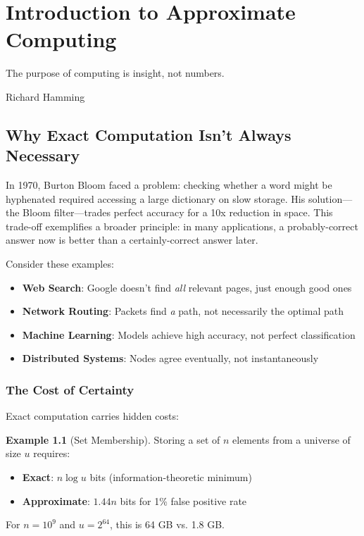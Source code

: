 \documentclass[11pt,twoside,openright]{book}
\theoremstyle{definition}
\newtheorem{example}[definition]{Example}
\theoremstyle{plain}
\theoremstyle{remark}
\begin{document}
\chapter{Introduction to Approximate Computing}
\label{ch:intro}

\epigraph{The purpose of computing is insight, not numbers.}{Richard Hamming}

\section{Why Exact Computation Isn't Always Necessary}

In 1970, Burton Bloom faced a problem: checking whether a word might be hyphenated required accessing a large dictionary on slow storage. His solution—the Bloom filter—trades perfect accuracy for a 10x reduction in space. This trade-off exemplifies a broader principle: in many applications, a probably-correct answer now is better than a certainly-correct answer later.

Consider these examples:
\begin{itemize}
    \item \textbf{Web Search}: Google doesn't find \emph{all} relevant pages, just enough good ones
    \item \textbf{Network Routing}: Packets find \emph{a} path, not necessarily the optimal path
    \item \textbf{Machine Learning}: Models achieve high accuracy, not perfect classification
    \item \textbf{Distributed Systems}: Nodes agree eventually, not instantaneously
\end{itemize}

\subsection{The Cost of Certainty}

Exact computation carries hidden costs:

\begin{example}[Set Membership]
Storing a set of $n$ elements from a universe of size $u$ requires:
\begin{itemize}
    \item \textbf{Exact}: $n \log u$ bits (information-theoretic minimum)
    \item \textbf{Approximate}: $1.44n$ bits for 1\% false positive rate
\end{itemize}
For $n = 10^9$ and $u = 2^{64}$, this is 64 GB vs. 1.8 GB.
\end{example}
\end{document}

